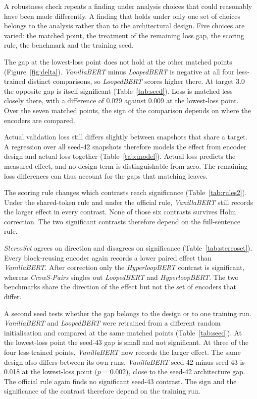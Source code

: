 \documentclass[sigconf,natbib=true]{acmart}
\begin{document}
A robustness check repeats a finding under analysis choices that could
reasonably have been made differently. A finding that holds under only one set of
choices belongs to the analysis rather than to the architectural design. Five choices are
varied: the matched point, the treatment of the remaining loss gap, the scoring
rule, the benchmark and the training seed.

The gap at the lowest-loss point does not hold at the other matched points
(Figure~\ref{fig:delta}). \emph{VanillaBERT} minus \emph{LoopedBERT} is negative
at all four less-trained distinct comparisons, so \emph{LoopedBERT} scores
higher there. At target 3.0 the opposite gap is itself significant
(Table~\ref{tab:seed}). Loss is matched less closely there, with a difference of
0.029 against 0.009 at the lowest-loss point. Over the
seven matched points, the sign of the comparison depends on where the encoders
are compared.

Actual validation loss still differs slightly between snapshots that share a
target. A regression over all seed-42 snapshots therefore models the effect from
encoder design and actual loss together (Table~\ref{tab:model}). Actual loss
predicts the measured effect, and no design term is distinguishable from zero.
The remaining loss differences can thus account for the gaps that matching
leaves.

The scoring rule changes which contrasts reach significance
(Table~\ref{tab:rules2}). Under the shared-token rule and under the official
rule, \emph{VanillaBERT} still records the larger effect in every contrast.
None of those six contrasts survives Holm correction. The two significant
contrasts therefore depend on the full-sentence rule.

\emph{StereoSet} agrees on direction and disagrees on significance
(Table~\ref{tab:stereoset}). Every block-reusing encoder again records a lower
paired effect than \emph{VanillaBERT}. After correction only the
\emph{HyperloopBERT} contrast is significant, whereas \emph{CrowS-Pairs} singles
out \emph{LoopedBERT} and \emph{HyperloopBERT}. The two benchmarks share the
direction of the effect but not the set of encoders that differ.

A second seed tests whether the gap belongs to the design or to one training
run. \emph{VanillaBERT} and \emph{LoopedBERT} were retrained from a different
random initialisation and compared at the same matched points
(Table~\ref{tab:seed}). At the lowest-loss point the seed-43 gap is small and
not significant. At three of the four less-trained points, \emph{VanillaBERT}
now records the larger effect. The same design also differs between its own
runs. \emph{VanillaBERT} seed 42 minus seed 43 is 0.018 at the lowest-loss point
($p=0.002$), close to the seed-42 architecture gap. The official rule again
finds no significant seed-43 contrast. The sign and the significance of the
contrast therefore depend on the training run.
\end{document}
